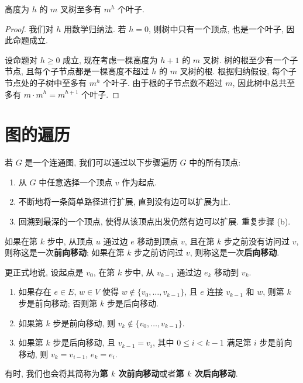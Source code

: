 \begin{theorem}
    高度为 $h$ 的 $m$ 叉树至多有 $m^h$ 个叶子.
\end{theorem}

\begin{proof}
    我们对 $h$ 用数学归纳法. 若 $h=0$, 则树中只有一个顶点, 也是一个叶子, 因此命题成立.

    设命题对 $h\geq 0$ 成立, 现在考虑一棵高度为 $h+1$ 的 $m$ 叉树. 树的根至少有一个子节点, 且每个子节点都是一棵高度不超过 $h$ 的 $m$ 叉树的根. 根据归纳假设, 每个子节点处的子树中至多有 $m^h$ 个叶子. 由于根的子节点数不超过 $m$, 因此树中总共至多有 $m\cdot m^h=m^{h+1}$ 个叶子.
\end{proof}

\section{图的遍历}
\begin{algo}
    若 $G$ 是一个连通图, 我们可以通过以下步骤遍历 $G$ 中的所有顶点:
    \begin{enumerate}[itemindent=0ex, itemsep=0pt, label=\upshape{(\alph*)}]
        \item 从 $G$ 中任意选择一个顶点 $v$ 作为起点.
        \item 不断地将一条简单路径进行扩展, 直到没有边可以扩展为止.
        \item 回溯到最深的一个顶点, 使得从该顶点出发仍然有边可以扩展. 重复步骤 \textup{(b)}.
    \end{enumerate}
\end{algo}

\begin{definition}
    如果在第 $k$ 步中, 从顶点 $u$ 通过边 $e$ 移动到顶点 $v$, 且在第 $k$ 步之前没有访问过 $v$, 则称这是一次\textbf{前向移动}; 如果在第 $k$ 步之前访问过 $v$, 则称这是一次\textbf{后向移动}.

    更正式地说, 设起点是 $v_0$, 在第 $k$ 步中, 从 $v_{k-1}$ 通过边 $e_k$ 移动到 $v_k$.
    \begin{enumerate}[itemindent=0ex, itemsep=0pt, label=\upshape{(\alph*)}]
        \item 如果存在 $e\in E$, $w\in V$ 使得 $w\not\in\{v_0,\dots, v_{k-1}\}$, 且 $e$ 连接 $v_{k-1}$ 和 $w$, 则第 $k$ 步是前向移动; 否则第 $k$ 步是后向移动.
        \item 如果第 $k$ 步是前向移动, 则 $v_k\not\in\{v_0,\dots,v_{k-1}\}$.
        \item 如果第 $k$ 步是后向移动, 且 $v_{k-1}=v_i$, 其中 $0\leq i<k-1$ 满足第 $i$ 步是前向移动, 则 $v_k=v_{i-1}$, $e_k=e_i$.
    \end{enumerate}

    有时, 我们也会将其简称为\textbf{第 $k$ 次前向移动}或者\textbf{第 $k$ 次后向移动}.
\end{definition}

